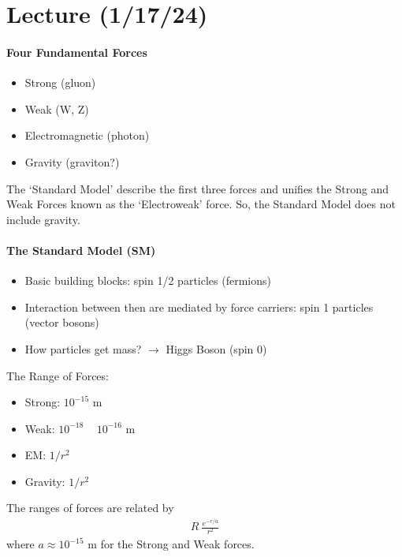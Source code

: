 \documentclass[../main.tex]{subfiles}
\begin{document}
\section{Lecture (1/17/24)}
\barh 

\paragraph{Four Fundamental Forces}

\begin{itemize}
    \item Strong (gluon)
    \item Weak (W, Z)
    \item Electromagnetic (photon)
    \item Gravity (graviton?)
\end{itemize}

The `Standard Model' describe the first three forces and unifies the Strong and Weak Forces known as
the `Electroweak' force. So, the Standard Model does not include gravity.

\paragraph{The Standard Model (SM)}
\begin{itemize}
    \item Basic building blocks: spin 1/2 particles (fermions)

    \item Interaction between then are mediated by force carriers:
    spin 1 particles (vector bosons)
    
    \item How particles get mass? $\rightarrow$ Higgs Boson (spin 0)
\end{itemize}

The Range of Forces:
\begin{itemize}
    \item Strong: $10^{-15}$ m
    \item Weak: $10^{-18}$ ~ $10^{-16}$ m
    \item EM: $1/r^2$
    \item Gravity: $1/r^2$
\end{itemize}

The ranges of forces are related by
\begin{align*}
    R ~ \frac{e^{-r/a}}{r^2}
\end{align*}
where $a \approx 10^{-15}$ m for the Strong and Weak forces.
\end{document}
